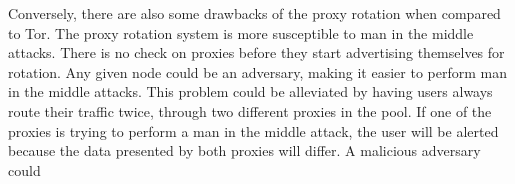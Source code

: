 Conversely, there are also some drawbacks of the proxy rotation when compared to Tor. The proxy rotation system is more susceptible to man in the middle attacks. There is no check on proxies before they start advertising themselves for rotation. Any given node could be an adversary, making it easier to perform man in the middle attacks. This problem could be alleviated by having users always route their traffic twice, through two different proxies in the pool. If one of the proxies is trying to perform a man in the middle attack, the user will be alerted because the data presented by both proxies will differ. A malicious adversary could  
